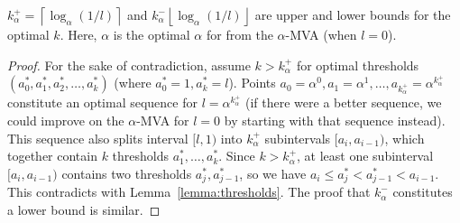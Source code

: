 \begin{theorem}\label{theorem:k_bounds}
$k_\alpha^+ = \left\lceil \log_{\alpha} \left(1/l\right) \right\rceil$ and 
$k_\alpha^- \left\lfloor \log_{\alpha} \left(1/l\right) \right\rfloor$ are upper
and lower bounds for the optimal $k$. Here, $\alpha$ is the optimal $\alpha$ for
from the
$\alpha$-MVA (when $l = 0$). 
\end{theorem}
\begin{proof}
For the sake of contradiction, assume $k > k_\alpha^+$ for optimal thresholds
$(a^*_0, a^*_1, a^*_2, \ldots, a^*_k)$ (where $a^*_0 = 1, a^*_k = l$).  
Points $a_0 = \alpha^0, a_1 = \alpha^1, \ldots, a_{k_\alpha^+} = \alpha^{k_\alpha^+}$
constitute an optimal sequence for $l=\alpha^{k_\alpha^+}$ (if there were a
better sequence, we could improve on the $\alpha$-MVA for $l=0$ by starting
with that sequence instead).
This sequence also
splits interval $[l, 1)$ into $k_\alpha^+$ subintervals $[a_i, a_{i-1})$, which
together contain $k$ thresholds $a^*_1, \ldots, a^*_k$. Since $k > k_\alpha^+$, at
least one subinterval $[a_i, a_{i-1})$ contains two thresholds $a^*_j,
a^*_{j-1}$, so we have $a_i \leq a^*_j < a^*_{j-1} < a_{i-1}$.  This
contradicts with Lemma~\ref{lemma:thresholds}.
The proof that $k_\alpha^-$ constitutes a lower bound is similar.
\end{proof}





